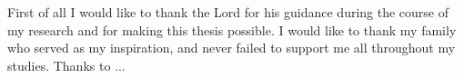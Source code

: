 
First of all I would like to thank the Lord for his guidance during
the course of my research and for making this thesis possible.
I would like to thank my family who served as my inspiration, and never
failed to support me all throughout my studies. Thanks to ...
